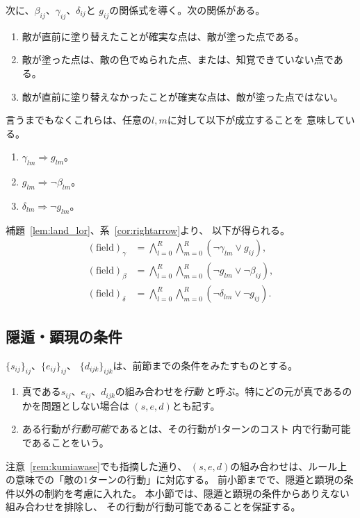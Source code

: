 次に、$\beta_{ij}$、$\gamma_{ij}$、$\delta_{ij}$と
$g_{ij}$の関係式を導く。次の関係がある。
\begin{enumerate}
 \item 敵が直前に塗り替えたことが確実な点は、敵が塗った点である。
 \item 敵が塗った点は、敵の色でぬられた点、または、知覚できていない点である。
 \item 敵が直前に塗り替えなかったことが確実な点は、敵が塗った点ではない。
\end{enumerate}
言うまでもなくこれらは、任意の$l, m$に対して以下が成立することを
意味している。
\begin{enumerate}
 \item $\gamma_{lm} \Rightarrow g_{lm}$。
 \item $g_{lm} \Rightarrow \lnot \beta_{lm}$。
 \item $\delta_{lm} \Rightarrow \lnot g_{lm}$。
\end{enumerate}
補題~\ref{lem:land_lor}、系~\ref{cor:rightarrow}より、
以下が得られる。
\begin{align*}
 (\text{field})_\gamma &=
 \bigwedge_{l = 0}^R  \bigwedge_{m = 0}^R (\lnot \gamma_{lm} \lor
 g_{ij}), \\
 (\text{field})_\beta &=
 \bigwedge_{l = 0}^R  \bigwedge_{m = 0}^R (\lnot g_{lm} \lor
 \lnot \beta_{ij}), \\
 (\text{field})_\delta &=
 \bigwedge_{l = 0}^R  \bigwedge_{m = 0}^R (\lnot \delta_{lm} \lor
 \lnot g_{ij}).
\end{align*}

\subsection{隠遁・顕現の条件}

\begin{defn}
 $\{s_{ij} \}_{ij}$、$\{e_{ij} \}_{ij}$、
 $\{d_{ijk} \}_{ijk}$は、前節までの条件をみたすものとする。
 \begin{enumerate}[1.]
  \item 真である$s_{ij}$、$e_{ij}$、$d_{ijk}$の組み合わせを\emph{行動}
        と呼ぶ。特にどの元が真であるのかを問題としない場合は
        $(s, e, d)$とも記す。
  \item ある行動が\emph{行動可能}であるとは、その行動が$1$ターンのコスト
        内で行動可能であることをいう。
 \end{enumerate}
\end{defn}

注意~\ref{rem:kumiawase}でも指摘した通り、
$(s, e, d)$の組み合わせは、ルール上の意味での「敵の$1$ターンの行動」に対応する。
前小節までで、隠遁と顕現の条件以外の制約を考慮に入れた。
本小節では、隠遁と顕現の条件からありえない組み合わせを排除し、
その行動が行動可能であることを保証する。

